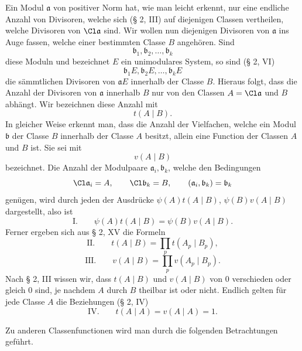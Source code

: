 Ein Modul $\mathfrak a$ von positiver Norm hat, wie man leicht erkennt, nur eine endliche Anzahl von Divisoren, welche sich (§ 2, III) auf diejenigen Classen vertheilen, welche Divisoren von $\Cl\mathfrak a$ sind. Wir wollen nun diejenigen Divisoren von $\mathfrak a$ ins Auge fassen, welche einer bestimmten Classe $B$ angehören. Sind
\[
 \mathfrak b_1,\mathfrak b_2,\ldots,\mathfrak b_k
\]
diese Moduln und bezeichnet $E$ ein unimodulares System, so sind (§ 2, VI)
\[
 \mathfrak b_1E,\mathfrak b_2E,\ldots,\mathfrak b_kE
\]
die sämmtlichen Divisoren von $\mathfrak aE$ innerhalb der Classe $B$. Hieraus folgt, dass die Anzahl der Divisoren von $\mathfrak a$ innerhalb $B$ nur von den Classen $A=\Cl\mathfrak a$ und $B$ abhängt. Wir bezeichnen diese Anzahl mit
\[
 t(A\mid B).
\]
In gleicher Weise erkennt man, dass die Anzahl der Vielfachen, welche ein Modul $\mathfrak b$ der Classe $B$ innerhalb der Classe $A$ besitzt, allein eine Function der Classen $A$ und $B$ ist. Sie sei mit
\[
 v(A\mid B)
\]
bezeichnet. Die Anzahl der Modulpaare $\mathfrak a_i,\mathfrak b_k$, welche den Bedingungen
\[
 \Cl\mathfrak a_i=A,
 \qquad
 \Cl\mathfrak b_k=B,
 \qquad
 (\mathfrak a_i,\mathfrak b_k)=\mathfrak b_k
\]
genügen, wird durch jeden der Ausdrücke $\psi(A)t(A\mid B)$, $\psi(B)v(A\mid B)$ dargestellt, also ist
\[
\text{I.}\qquad
 \psi(A)t(A\mid B)=\psi(B)v(A\mid B).
\]
Ferner ergeben sich aus § 2, XV die Formeln
\[
\text{II.}\qquad t(A\mid B)=\prod_p t(A_p\mid B_p),
\]
\[
\text{III.}\qquad v(A\mid B)=\prod_p v(A_p\mid B_p).
\]
Nach § 2, III wissen wir, dass $t(A\mid B)$ und $v(A\mid B)$ von 0 verschieden oder gleich 0 sind, je nachdem $A$ durch $B$ theilbar ist oder nicht. Endlich gelten für jede Classe $A$ die Beziehungen (§ 2, IV)
\[
\text{IV.}\qquad t(A\mid A)=v(A\mid A)=1.
\]

Zu anderen Classenfunctionen wird man durch die folgenden Betrachtungen geführt.

